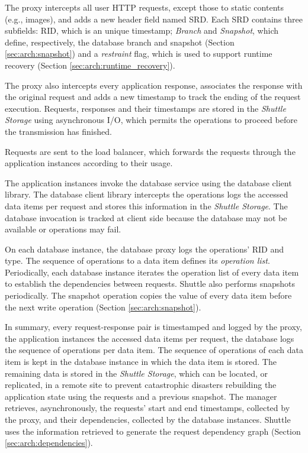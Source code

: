 The proxy intercepts all user \ac{HTTP} requests, except those to static contents (e.g., images), and adds a new header field named \acf{SRD}. Each \ac{SRD} contains three subfields: \acf{RID}, which is an unique timestamp; \emph{Branch} and \emph{Snapshot}, which define, respectively, the database branch and snapshot (Section \ref{sec:arch:snapshot}) and a \emph{restraint} flag, which is used to support runtime recovery (Section \ref{sec:arch:runtime_recovery}). 

The proxy also intercepts every application response, associates the response with the original request and adds a new timestamp to track the ending of the request execution. Requests, responses and their timestamps are stored in the \emph{Shuttle Storage} using asynchronous I/O, which permits the operations to proceed before the transmission has finished. 

Requests are sent to the load balancer, which forwards the requests through the application instances according to their usage.

The application instances invoke the database service using the database client library. The database client library intercepts the operations logs the accessed data items per request and stores this information in the \emph{Shuttle Storage}. The database invocation is tracked at client side because the database may not be available or operations may fail.

On each database instance, the database proxy logs the operations' \ac{RID} and type. The sequence of operations to a data item defines its \emph{operation list}. Periodically, each database instance iterates the operation list of every data item to establish the dependencies between requests. Shuttle also performs snapshots periodically. The snapshot operation copies the value of every data item before the next write operation (Section \ref{sec:arch:snapshot}).


In summary, every request-response pair is timestamped and logged by the proxy, the application instances the accessed data items per request, the database logs the sequence of operations per data item. The sequence of operations of each data item is kept in the database instance in which the data item is stored. The remaining data is stored in the \emph{Shuttle Storage}, which can be located, or replicated, in a remote site to prevent catastrophic disasters rebuilding the application state using the requests and a previous snapshot. The manager retrieves, asynchronously, the requests' start and end timestamps, collected by the proxy, and their dependencies, collected by the database instances. Shuttle uses the information retrieved to generate the request dependency graph (Section \ref{sec:arch:dependencies}).






